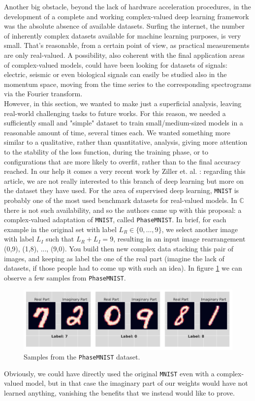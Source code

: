 \documentclass[../main.tex]{subfiles}
\begin{document}
Another big obstacle, beyond the lack of hardware acceleration procedures, in the development of a complete and working complex-valued deep learning framework was the absolute absence of available datasets. Surfing the internet, the number of inherently complex datasets available for machine learning purposes, is very small. That's reasonable, from a certain point of view, as practical measurements are only real-valued. A possibility, also coherent with the final application areas of complex-valued models, could have been looking for datasets of signals: electric, seismic or even biological signals can easily be studied also in the momentum space, moving from the time series to the corresponding spectrograms via the Fourier transform.\\
However, in this section, we wanted to make just a superficial analysis, leaving real-world challenging tasks to future works. For this reason, we needed a sufficiently small and "simple" dataset to train small/medium-sized models in a reasonable amount of time, several times each. We wanted something more similar to a qualitative, rather than quantitative, analysis, giving more attention to the stability of the loss function, during the training phase, or to configurations that are more likely to overfit, rather than to the final accuracy reached.
In our help it comes a very recent work by Ziller et. al. \cite{ziller2021complexvalued}: regarding this article, we are not really interested to this branch of deep learning but more on the dataset they have used. For the area of supervised deep learning, \texttt{MNIST} is probably one of the most used benchmark datasets for real-valued models. In $\mathds{C}$ there is not such availability, and so the authors came up with this proposal: a complex-valued adaptation of \texttt{MNIST}, called \texttt{PhaseMNIST}. In brief, for each example in the original set with label $L_R\in\{0,\dots,9\}$, we select another image with label $L_I$ such that $L_R + L_I = 9$, resulting in an input image rearrangement (0,9), (1,8), ..., (9,0). You build then new complex data stacking this pair of images, and keeping as label the one of the real part (imagine the lack of datasets, if those people had to come up with such an idea). In figure \ref{fig:phasemnist_example} we can observe a few samples from \texttt{PhaseMNIST}. 
\begin{figure}[!ht]
	\centering
	\includegraphics[width=\textwidth]{pictures/phasemnist_example}
	\caption{Samples from the \texttt{PhaseMNIST} dataset.}
	\label{fig:phasemnist_example}
\end{figure}
Obviously, we could have directly used the original \texttt{MNIST} even with a complex-valued model, but in that case the imaginary part of our weights would have not learned anything, vanishing the benefits that we instead would like to prove.
\end{document}
